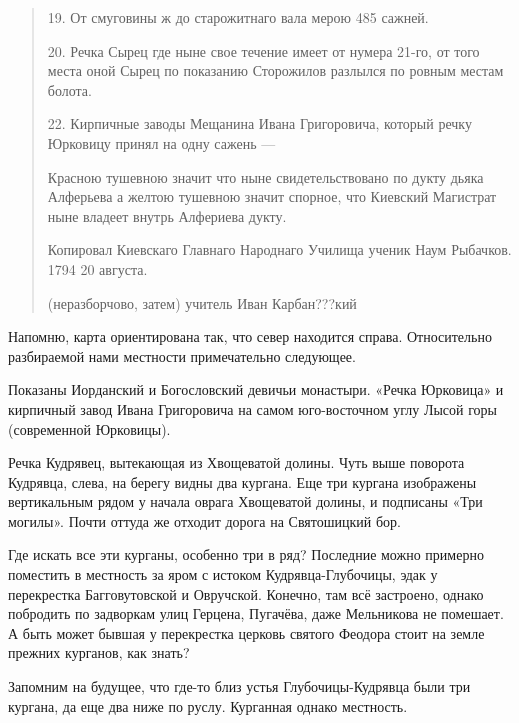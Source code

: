 \begin{quotation}
19. От смуговины ж до старожитнаго вала мерою 485 сажней.

20. Речка Сырец где ныне свое течение имеет от нумера 21-го, от того места оной Сырец по показанию Сторожилов разлылся по ровным местам болота.

22. Кирпичные заводы Мещанина Ивана Григоровича, который речку Юрковицу принял на одну сажень ---

Красною тушевною значит что ныне свидетельствовано по дукту дьяка Алферьева а желтою тушевною значит спорное, что Киевский Магистрат ныне владеет внутрь Алфериева дукту.

Копировал Киевскаго Главнаго Народнаго Училища ученик Наум Рыбачков. 1794 20 августа.

(неразборчово, затем) учитель Иван Карбан???кий
\end{quotation}

Напомню, карта ориентирована так, что север находится справа. Относительно разбираемой нами местности примечательно следующее.

Показаны Иорданский и Богословский девичьи монастыри. «Речка Юрковица» и кирпичный завод Ивана Григоровича на самом юго-восточном углу Лысой горы (современной Юрковицы).

Речка Кудрявец, вытекающая из Хвощеватой долины. Чуть выше поворота Кудрявца, слева, на берегу видны два кургана. Еще три кургана изображены вертикальным рядом у начала оврага Хвощеватой долины, и подписаны «Три могилы». Почти оттуда же отходит дорога на Святошицкий бор.

Где искать все эти курганы, особенно три в ряд? Последние можно примерно поместить в местность за яром с истоком Кудрявца-Глубочицы, эдак у перекрестка Багговутовской и Овручской. Конечно, там всё застроено, однако побродить по задворкам улиц Герцена, Пугачёва, даже Мельникова не помешает. А быть может бывшая у перекрестка церковь святого Феодора стоит на земле прежних курганов, как знать?

Запомним на будущее, что где-то близ устья Глубо\-чицы-Кудрявца были три кургана, да еще два ниже по руслу. Курганная однако местность.
